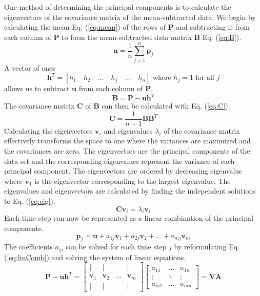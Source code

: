 One method of determining the principal components is to calculate the eigenvectors of the covariance matrix of the mean-subtracted data. We begin by calculating the mean Eq. (\ref{eq:mean}) of the rows of $\mathbf{P}$ and subtracting it from each column of $\mathbf{P}$ to form the mean-subtracted data matrix $\mathbf{B}$ Eq. (\ref{eq:B}).
\begin{equation}
    \mathbf{u}=\frac{1}{n}\sum_{j=1}^n\mathbf{p}_j
    \label{eq:mean}
\end{equation}
A vector of ones
\begin{displaymath}
    \mathbf{h}^T=\left[h_1\quad h_2\quad\ldots\quad h_j\quad\ldots\quad h_n\right]\textrm{ where }h_j=1\textrm{ for all }j
    \label{eq:h}
\end{displaymath}
allows us to subtract $\mathbf{u}$ from each column of $\mathbf{P}$,
\begin{equation}
    \mathbf{B}=\mathbf{P}-\mathbf{u}\mathbf{h}^T
    \label{eq:B}
\end{equation}
The covariance matrix $\mathbf{C}$ of $\mathbf{B}$ can then be calculated with Eq. (\ref{eq:C}).
\begin{equation}
    \mathbf{C}=\frac{1}{n-1}\mathbf{B}{\mathbf{B}^T}
    \label{eq:C}
\end{equation}
Calculating the eigenvectors $\mathbf{v}_i$ and eigenvalues $\lambda_i$ of the covariance matrix effectively transforms the space to one where the variances are maximized and the covariances are zero. The eigenvectors are the principal components of the data set and the corresponding eigenvalues represent the variance of each principal component. The eigenvectors are ordered by decreasing eigenvalue where $\mathbf{v}_1$ is the eigenvector corresponding to the largest eigenvalue. The eigenvalues and eigenvectors are calculated by finding the independent solutions to Eq. (\ref{eq:eig}).
\begin{equation}
    \mathbf{C}\mathbf{v}_i=\lambda_i\mathbf{v}_i
    \label{eq:eig}
\end{equation}
Each time step can now be represented as a linear combination of the principal components.
\begin{equation}
    \mathbf{p}_j=\mathbf{u}+a_{1j}\mathbf{v}_1+a_{2j}\mathbf{v}_2+\ldots+a_{mj}\mathbf{v}_m
    \label{eq:linComb}
\end{equation}
The coefficients $a_{ij}$ can be solved for each time step $j$ by reformulating Eq. (\ref{eq:linComb}) and solving the system of linear equations.
\begin{equation}
    \mathbf{P}-\mathbf{u}\mathbf{h}^T=
    \left[\begin{array}{cccc}
        | & | & & |\\
        \mathbf{v}_1 & \mathbf{v}_2 & \ldots & \mathbf{v}_m\\
        | & | & & |
    \end{array}\right]
    \left[\begin{array}{ccc}
    a_{11} & \ldots & a_{1n}\\
    \vdots & \ddots & \vdots\\
    a_{m1} & \ldots & a_{mn}
    \end{array}\right]
    =\mathbf{V}\mathbf{A}
\end{equation}
